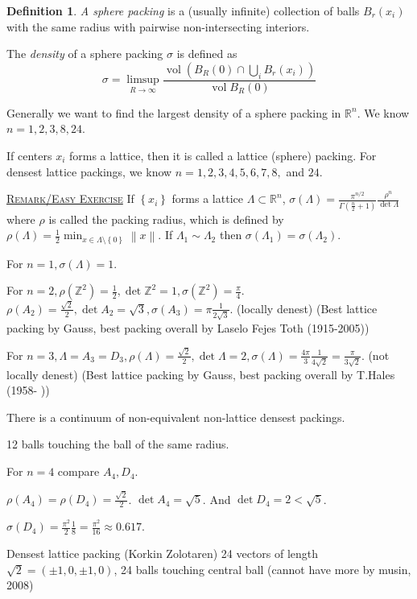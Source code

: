 \documentclass{report}
\newcommand{\R}{\mathbb{R}}
\newcommand{\Z}{\mathbb{Z}}
\newcommand{\vol}{\operatorname{vol}}
\newcommand{\norm}[1]{\left\| #1 \right\|}
\newcommand{\set}[1]{\left\{ #1 \right\}}
\newcommand{\fancyem}[1]{\underline{\textsc{#1}}}
\theoremstyle{definition}
\newtheorem{definition}{Definition}[section]
\theoremstyle{remark}
\numberwithin{equation}{section}
\begin{document}
\begin{definition}
    \emph{A sphere packing} is a (usually infinite) collection of balls $B_r(x_i)$ with the same radius with pairwise non-intersecting interiors.
    
    The \emph{density} of a sphere packing $\sigma$ is defined as \[
        \sigma = \limsup_{R\to\infty} \frac{\vol\left(B_R(0) \cap \bigcup_i B_r(x_i)\right)}{\vol B_R(0)}\]
\end{definition}

Generally we want to find the largest density of a sphere packing in $\R^n$. We know $n=1, 2, 3, 8, 24$.

If centers $x_i$ forms a lattice, then it is called a lattice (sphere) packing. For densest lattice packings, we know $n = 1, 2, 3, 4, 5, 6, 7, 8, $ and $24$.

\fancyem{Remark/Easy Exercise} If $\set{x_i}$ forms a lattice $\Lambda \subset \R^n$, $\sigma(\Lambda) = \frac{\pi^{n/2}}{\Gamma\left(\frac{n}{2}+1\right)}\frac{\rho^n}{\det \Lambda}$ where $\rho$ is called the packing radius, which is defined by $\rho(\Lambda) = \frac{1}{2}\min_{x \in \Lambda \setminus \set{0}} \norm{x}$. If $\Lambda_1 \sim \Lambda_2$ then $\sigma(\Lambda_1) = \sigma(\Lambda_2)$.

For $n=1, \sigma(\Lambda) = 1$.

For $n=2, \rho(\Z^2) = \frac{1}{2}, \det \Z^2 = 1, \sigma(\Z^2) = \frac{\pi}{4}$.
$\rho(A_2) = \frac{\sqrt{2}}{2}, \det A_2 = \sqrt{3}, \sigma(A_3) = \pi \frac{1}{2\sqrt{3}}$. (locally denest) (Best lattice packing by Gauss, best packing overall by Laselo Fejes Toth (1915-2005))

For $n = 3, \Lambda = A_3 = D_3, \rho(\Lambda) = \frac{\sqrt{2}}{2}, \det \Lambda = 2, \sigma(\Lambda) = \frac{4\pi}{3}\frac{1}{4\sqrt{2}} = \frac{\pi}{3\sqrt{2}}$. (not locally denest) (Best lattice packing by Gauss, best packing overall by T.Hales (1958- ))

There is a continuum of non-equivalent non-lattice densest packings.

12 balls touching the ball of the same radius.

For $n = 4$ compare $A_4, D_4$.

$\rho(A_4) = \rho(D_4) = \frac{\sqrt{2}}{2}$. $\det A_4 = \sqrt{5}$. And $\det D_4 = 2 < \sqrt{5}$.

$\sigma(D_4) = \frac{\pi^2}{2}\frac{1}{8} = \frac{\pi^2}{16} \approx 0.617$.

Densest lattice packing (Korkin Zolotaren)
24 vectors of length $\sqrt{2} = (\pm1,0,\pm1, 0)$, 24 balls touching central ball (cannot have more by musin, 2008)
\end{document}
